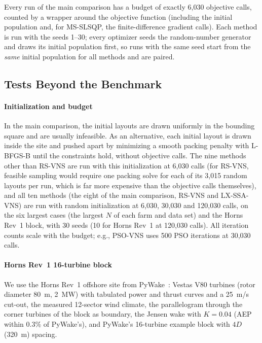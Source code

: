 \documentclass[journal,twoside]{IEEEtran}
\begin{document}
Every run of the main comparison has a budget of exactly 6,030 objective calls, counted by a wrapper around the objective function (including the initial population and, for MS-SLSQP, the finite-difference gradient calls). Each method is run with the seeds 1--30; every optimizer seeds the random-number generator and draws its initial population first, so runs with the same seed start from the \emph{same} initial population for all methods and are paired.

\subsection{Tests Beyond the Benchmark}
\label{sec:setup-beyond}
\paragraph*{Initialization and budget} In the main comparison, the initial layouts are drawn uniformly in the bounding square and are usually infeasible. As an alternative, each initial layout is drawn inside the site and pushed apart by minimizing a smooth packing penalty with L-BFGS-B until the constraints hold, without objective calls. The nine methods other than RS-VNS are run with this initialization at 6,030 calls (for RS-VNS, feasible sampling would require one packing solve for each of its 3,015 random layouts per run, which is far more expensive than the objective calls themselves), and all ten methods (the eight of the main comparison, RS-VNS and LX-SSA-VNS) are run with random initialization at 6,030, 30,030 and 120,030 calls, on the six largest cases (the largest $N$ of each farm and data set) and the Horns Rev~1 block, with 30 seeds (10 for Horns Rev~1 at 120,030 calls). All iteration counts scale with the budget; e.g., PSO-VNS uses 500 PSO iterations at 30,030 calls.

\paragraph*{Horns Rev~1 16-turbine block} We use the Horns Rev~1 offshore site from PyWake~\cite{PyWake}: Vestas V80 turbines (rotor diameter 80~m, 2~MW) with tabulated power and thrust curves and a 25~m/s cut-out, the measured 12-sector wind climate, the parallelogram through the corner turbines of the block as boundary, the Jensen wake with $K=0.04$ (AEP within 0.3\% of PyWake's), and PyWake's 16-turbine example block with $4D$ (320~m) spacing.
\end{document}
